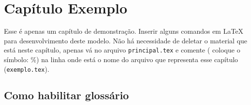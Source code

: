 
\chapter{Capítulo Exemplo}\label{chp:exemplos}

\begin{resumocapitulo}
Esse é apenas um capítulo de demonstração. Inserir alguns comandos em \LaTeX{} para desenvolvimento deste modelo. Não há necessidade de deletar o material que está neste capítulo, apenas vá no arquivo \texttt{principal.tex} e comente ( coloque o símbolo: \%) na linha onde está o nome do arquivo que representa esse capítulo (\texttt{exemplo.tex}).
\end{resumocapitulo}

\section{Como habilitar glossário}

